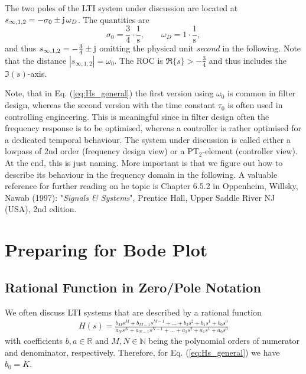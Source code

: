 \documentclass[a4paper,11pt,oneside]{scrartcl}
\newcommand{\eq}[1]{Eq. (\ref{#1})}
\begin{document}
%
The two poles of the LTI system under discussion are located at
$s_{\infty,1,2} = -\sigma_0 \pm \im\,\omega_D$.
The quantities are
\begin{equation}
\sigma_0 = \frac{3}{4}\cdot \frac{\text{1}}{\text{s}},\qquad
\omega_D = 1 \cdot \frac{\text{1}}{\text{s}},
\end{equation}
%
and thus $s_{\infty,1,2} = -\frac{3}{4} \pm \im$
omitting the physical unit \textit{second} in the following.
%
Note that the distance $|s_{\infty,1,2}| = \omega_0$.
%
The ROC is $\Re\{s\}>-\frac{3}{4}$ and thus includes the $\Im(s)$-axis.

Note, that in \eq{eq:Hs_general} the first version using $\omega_0$ is
common in filter design, whereas the second version with the time
constant $\tau_0$ is often used in controlling engineering. This is
meaningful since in filter design often the frequency response is to be optimised,
whereas a controller is rather optimised for a dedicated temporal behaviour.
%
The system under discussion is called either a lowpass of 2nd order
(frequency design view) or a PT$_2$-element (controller view).
At the end, this is just naming. More important is that we figure out how to describe its behaviour in the frequency domain in the following. A valuable reference for further reading on he topic is Chapter 6.5.2
in Oppenheim, Willsky, Nawab (1997): "\textit{Signals \& Systems}", Prentice Hall, Upper Saddle River NJ (USA), 2nd edition.




\section{Preparing for Bode Plot}
\subsection{Rational Function in Zero/Pole Notation}
We often discuss LTI systems that are described by a rational function
\begin{align}
\label{eq:Hs_b_a}
H(s) = \frac
{b_M s^M + b_{M-1} s^{M-1} + \dots + b_2 s^2 + b_1 s^1 + b_0 s^0}
{a_N s^N + a_{N-1} s^{N-1} + \dots + a_2 s^2 + a_1 s^1 + a_0 s^0}
\end{align}
with coefficients $b,a \in \mathbb{R}$ and $M,N \in \mathbb{N}$ being the
polynomial orders of numerator and denominator, respectively.
%
Therefore, for \eq{eq:Hs_general} we have $b_0 = K$.
%
\end{document}
